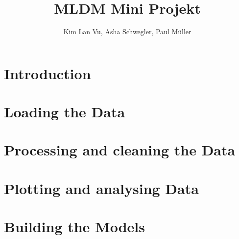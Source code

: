 \documentclass{article}
\title{MLDM Mini Projekt}
\author{Kim Lan Vu, Asha Schwegler, Paul Müller}
\begin{document}
\maketitle
\tableofcontents
\newpage


\section{Introduction}


\section{Loading the Data}


\section{Processing and cleaning the Data}


\section{Plotting and analysing Data}


\section{Building the Models}

\end{document}
